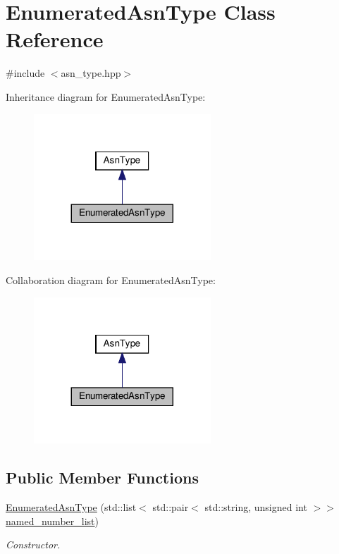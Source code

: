 \hypertarget{classEnumeratedAsnType}{}\section{Enumerated\+Asn\+Type Class Reference}
\label{classEnumeratedAsnType}


{\ttfamily \#include $<$asn\+\_\+type.\+hpp$>$}



Inheritance diagram for Enumerated\+Asn\+Type\+:
\nopagebreak
\begin{figure}[H]
\begin{center}
\leavevmode
\includegraphics[width=188pt]{d7/d00/classEnumeratedAsnType__inherit__graph}
\end{center}
\end{figure}


Collaboration diagram for Enumerated\+Asn\+Type\+:
\nopagebreak
\begin{figure}[H]
\begin{center}
\leavevmode
\includegraphics[width=188pt]{df/df0/classEnumeratedAsnType__coll__graph}
\end{center}
\end{figure}
\subsection*{Public Member Functions}
\begin{DoxyCompactItemize}
\item 
\hyperlink{classEnumeratedAsnType_a096266b08e601a619f200239f883c3c6}{Enumerated\+Asn\+Type} (std\+::list$<$ std\+::pair$<$ std\+::string, unsigned int $>$$>$ \hyperlink{classEnumeratedAsnType_a7393f9a5ef4fe7295453e1eb16b3607a}{named\+\_\+number\+\_\+list})
\begin{DoxyCompactList}\small\item\em Constructor. \end{DoxyCompactList}\end{DoxyCompactItemize}
